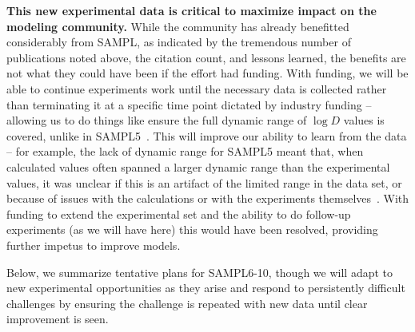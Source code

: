 \documentclass[11pt]{article}
\begin{document}
\textbf{This new experimental data is critical to maximize impact on the modeling community. } %
While the community has already benefitted considerably from SAMPL, as indicated by the tremendous number of publications noted above, the citation count, and lessons learned, the benefits are not what they could have been if the effort had funding.
With funding, we will be able to continue experiments work until the necessary data is collected rather than terminating it at a specific time point dictated by industry funding -- allowing us to do things like ensure the full dynamic range of $\log D$ values is covered, unlike in SAMPL5~\cite{rustenburg_measuring_2016, bannan_blind_2016}.
This will improve our ability to learn from the data -- for example, the lack of dynamic range for SAMPL5 meant that, when calculated values often spanned a larger dynamic range than the experimental values, it was unclear if this is an artifact of the limited range in the data set, or because of issues with the calculations or with the experiments themselves~\cite{rustenburg_measuring_2016, bannan_blind_2016, paranahewage_predicting_2016, klamt_prediction_2016}. 
With funding to extend the experimental set and the ability to do follow-up experiments (as we will have here) this would have been resolved, providing further impetus to improve models.

Below, we summarize tentative plans for SAMPL6-10, though we will adapt to new experimental opportunities as they arise and respond to persistently difficult challenges by ensuring the challenge is repeated with new data until clear improvement is seen.
\end{document}
